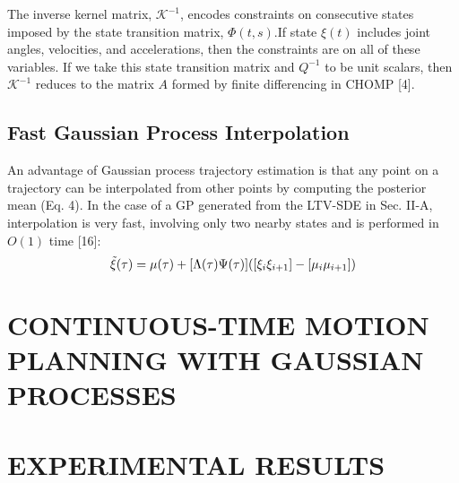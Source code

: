 \documentclass{IEEEtran}
\begin{document}
The inverse kernel matrix, ${\mathcal{K}}^{-1}$, encodes constraints on
consecutive states imposed by the state transition matrix,
$\Phi(t, s)$.If state $\xi(t)$ includes joint angles, velocities, and
accelerations, then the constraints are on all of these variables. If we take this state transition matrix and $Q^{-1}$
to be
unit scalars, then ${\mathcal{K}}^{-1}$
reduces to the matrix $\textit{A}$ formed by
finite differencing in CHOMP [4].

\subsection{Fast Gaussian Process Interpolation}

An advantage of Gaussian process trajectory estimation
is that any point on a trajectory can be interpolated from
other points by computing the posterior mean (Eq. 4). In
the case of a GP generated from the LTV-SDE in Sec. II-A,
interpolation is very fast, involving only two nearby states
and is performed in $\textit{O}(1)$ time [16]:
\begin{equation}
\tilde{\xi}(\tau)=\mu(\tau)+[\Lambda(\tau)\Psi(\tau)]([{\xi_i}\\{\xi_{i+1}}]-[{\mu_i}\\{\mu_{i+1}}])
\end{equation}
\section{CONTINUOUS-TIME MOTION PLANNING WITH GAUSSIAN PROCESSES}
\section{EXPERIMENTAL RESULTS}
\end{document}
